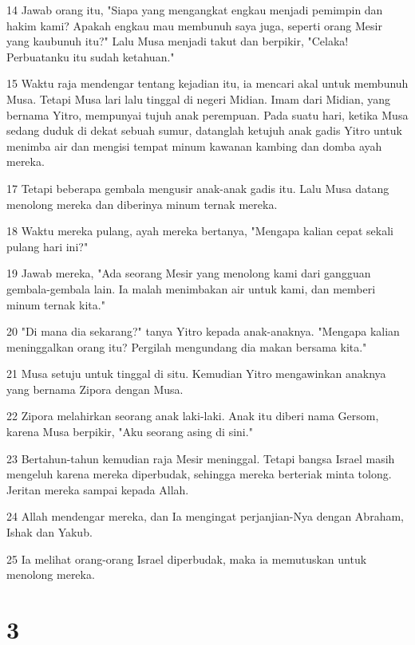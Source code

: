 \par 14 Jawab orang itu, "Siapa yang mengangkat engkau menjadi pemimpin dan hakim kami? Apakah engkau mau membunuh saya juga, seperti orang Mesir yang kaubunuh itu?" Lalu Musa menjadi takut dan berpikir, "Celaka! Perbuatanku itu sudah ketahuan."
\par 15 Waktu raja mendengar tentang kejadian itu, ia mencari akal untuk membunuh Musa. Tetapi Musa lari lalu tinggal di negeri Midian. Imam dari Midian, yang bernama Yitro, mempunyai tujuh anak perempuan. Pada suatu hari, ketika Musa sedang duduk di dekat sebuah sumur, datanglah ketujuh anak gadis Yitro untuk menimba air dan mengisi tempat minum kawanan kambing dan domba ayah mereka.
\par 17 Tetapi beberapa gembala mengusir anak-anak gadis itu. Lalu Musa datang menolong mereka dan diberinya minum ternak mereka.
\par 18 Waktu mereka pulang, ayah mereka bertanya, "Mengapa kalian cepat sekali pulang hari ini?"
\par 19 Jawab mereka, "Ada seorang Mesir yang menolong kami dari gangguan gembala-gembala lain. Ia malah menimbakan air untuk kami, dan memberi minum ternak kita."
\par 20 "Di mana dia sekarang?" tanya Yitro kepada anak-anaknya. "Mengapa kalian meninggalkan orang itu? Pergilah mengundang dia makan bersama kita."
\par 21 Musa setuju untuk tinggal di situ. Kemudian Yitro mengawinkan anaknya yang bernama Zipora dengan Musa.
\par 22 Zipora melahirkan seorang anak laki-laki. Anak itu diberi nama Gersom, karena Musa berpikir, "Aku seorang asing di sini."
\par 23 Bertahun-tahun kemudian raja Mesir meninggal. Tetapi bangsa Israel masih mengeluh karena mereka diperbudak, sehingga mereka berteriak minta tolong. Jeritan mereka sampai kepada Allah.
\par 24 Allah mendengar mereka, dan Ia mengingat perjanjian-Nya dengan Abraham, Ishak dan Yakub.
\par 25 Ia melihat orang-orang Israel diperbudak, maka ia memutuskan untuk menolong mereka.

\chapter{3}

